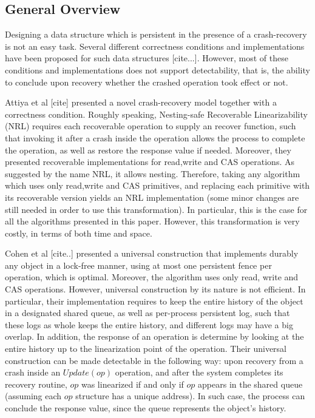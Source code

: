 \subsection{General Overview}
Designing a data structure which is persistent in the presence of a crash-recovery is not an easy task. Several different correctness conditions and implementations have been proposed for such data structures [cite...]. However, most of these conditions and implementations does not support detectability, that is, the ability to conclude upon recovery whether the crashed operation took effect or not.

Attiya et al [cite] presented a novel crash-recovery model together with a correctness condition. Roughly speaking, Nesting-safe Recoverable Linearizability (NRL) requires each recoverable operation to supply an recover function, such that invoking it after a crash inside the operation allows the process to complete the operation, as well as restore the response value if needed. Moreover, they presented recoverable implementations for read,write and CAS operations. As suggested by the name NRL, it allows nesting. Therefore, taking any algorithm which uses only read,write and CAS primitives, and replacing each primitive with its recoverable version yields an NRL implementation (some minor changes are still needed in order to use this transformation). In particular, this is the case for all the algorithms presented in this paper. However, this transformation is very costly, in terms of both time and space.

Cohen et al [cite..] presented a universal construction that implements durably any object in a lock-free manner, using at most one persistent fence per operation, which is optimal. Moreover, the algorithm uses only read, write and CAS operations. However, universal construction by its nature is not efficient. In particular, their implementation requires to keep the entire history of the object in a designated shared queue, as well as per-process persistent log, such that these logs as whole keeps the entire history, and different logs may have a big overlap. In addition, the response of an operation is determine by looking at the entire history up to the linearization point of the operation. Their universal construction can be made detectable in the following way: upon recovery from a crash inside an $Update(op)$ operation, and after the system completes its recovery routine, $op$ was linearized if and only if $op$ appears in the shared queue (assuming each $op$ structure has a unique address). In such case, the process can conclude the response value, since the queue represents the object's history.

